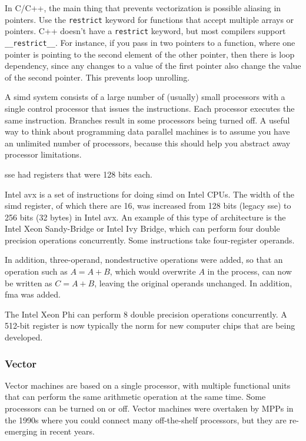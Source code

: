 \documentclass[10pt]{article}
\newcounter{subsubsubsection}[subsubsection]
\begin{document}
\begin{flushleft}
In C/C++, the main thing that prevents vectorization is possible aliasing in pointers. Use the {\tt restrict} keyword for functions that accept multiple arrays or pointers. C++ doesn't have a {\tt restrict} keyword, but most compilers support {\tt \_\_restrict\_\_}. For instance, if you pass in two pointers to a function, where one pointer is pointing to the second element of the other pointer, then there is loop dependency, since any changes to a value of the first pointer also change the value of the second pointer. This prevents loop unrolling.

A \gls{simd} system consists of a large number of (usually) small processors with a single control processor that issues the instructions. Each processor executes the same instruction. Branches result in some processors being turned off. A useful way to think about programming data parallel machines is to assume you have an unlimited number of processors, because this should help you abstract away processor limitations. 


\gls{sse} had registers that were 128 bits each. 


Intel \gls{avx} is a set of instructions for doing \gls{simd} on Intel CPUs. The width of the \gls{simd} register, of which there are 16, was increased from 128 bits (legacy \gls{sse}) to 256 bits (32 bytes) in Intel \gls{avx}. An example of this type of architecture is the Intel Xeon Sandy-Bridge or Intel Ivy Bridge, which can perform four double precision operations concurrently. Some instructions take four-register operands. 

In addition, three-operand, nondestructive operations were added, so that an operation such as \(A=A+B\), which would overwrite \(A\) in the process, can now be written as \(C=A+B\), leaving the original operands unchanged. In addition, \gls{fma} was added. 


The Intel Xeon Phi can perform 8 double precision operations concurrently. A 512-bit register is now typically the norm for new computer chips that are being developed.

\subsubsection{Vector}

Vector machines are based on a single processor, with multiple functional units that can perform the same arithmetic operation at the same time. Some processors can be turned on or off. Vector machines were overtaken by MPPs in the 1990s where you could connect many off-the-shelf processors, but they are re-emerging in recent years. 


\end{flushleft}
\end{document}
